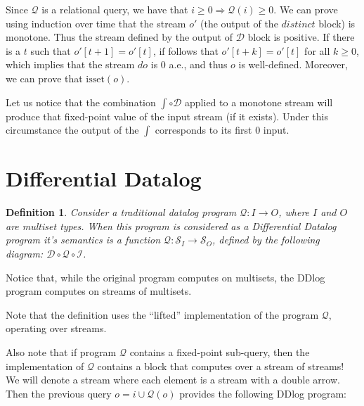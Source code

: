 \documentclass[10pt]{article}
\newtheorem{definition}{Definition}[section]
\newcommand{\stream}[1]{\ensuremath{\mathcal{S}_{#1}}}
\newcommand{\I}{\mathcal{I}}  %
\newcommand{\D}{\mathcal{D}}  %
\newcommand{\distinct}{\mathit{distinct}}  %
\newcommand{\q}{\ensuremath{\mathcal{Q}}}  %
\newcommand{\isset}{\mbox{isset}}
\begin{document}
Since $\q$ is a relational query, we have that $i \geq 0 \Rightarrow
\q(i) \geq 0$.  We can prove using induction over time that the stream
$o'$ (the output of the $\distinct$ block) is monotone.  Thus the
stream defined by the output of $\D$ block is positive.  If there is a
$t$ such that $o'[t + 1] = o'[t]$, if follows that $o'[t + k] = o'[t]$
for all $k \geq 0$, which implies that the stream $do$ is 0 a.e., and
thus $o$ is well-defined.  Moreover, we can prove that $\isset(o)$.

Let us notice that the combination $\int \circ \D$ applied to a
monotone stream will produce that fixed-point value of the input
stream (if it exists).  Under this circumstance the output of the
$\int$ corresponds to its first $0$ input.

\section{Differential Datalog}

\begin{definition}
Consider a traditional datalog program $\q: I \rightarrow O$, where
$I$ and $O$ are multiset types.  When this program is considered as a
Differential Datalog program it's semantics is a function $\q:
\stream{I} \rightarrow \stream{O}$, defined by the following diagram:
$\D \circ \q \circ \I$.
\end{definition}  Notice that, while the original program computes on
multisets, the DDlog program computes on streams of multisets.


Note that the definition uses the ``lifted'' implementation of the
program $\q$, operating over streams.

Also note that if program $\q$ contains a fixed-point sub-query, then
the implementation of $\q$ contains a block that computes over a
stream of streams!  We will denote a stream where each element is a
stream with a double arrow.  Then the previous query $o = i \cup
\q(o)$ provides the following DDlog program:
\end{document}
